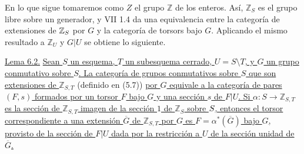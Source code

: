 En lo que sigue tomaremos como $Z$ el grupo $\mathbb Z$ de los
enteros. Así, $\mathbb Z_S$ es el grupo libre sobre un generador, y
VII 1.4 da una equivalencia entre la categoría de extensiones de
$\sisi{\mathbb Z_Z}{\mathbb Z_S}$ por $G$ y la categoría de torsors
bajo $G$. Aplicando el mismo resultado a $\mathbb Z_U$ y $G|U$ se
obtiene lo siguiente.

\medskip
\noindent\underline{Lema 6.2.} \underline{Sean $S$ un esquema, $T$ un
subesquema cerrado, $U=S\setminus T$, y $G$ un grupo conmutativo sobre
$S$. La categoría de grupos conmutativos sobre $S$ que son extensiones
de $\mathbb Z_{S,T}$} (definido en (5.7)) \underline{por $G$ equivale
a la categoría de pares $(F,s)$ formados por un torsor $F$ bajo $G$ y
una sección $s$ de $F|U$. Si $\alpha:S\to\mathbb Z_{S,T}$ es la
sección de $\mathbb Z_{S,T}$ imagen de la sección $1$ de $\mathbb Z_S$
sobre $\sisi{{}_{\overline G}S}{S}$, entonces el torsor correspondiente
a una extensión $\overline G$ de $\mathbb Z_{S,T}$ por $G$ es
$F=\alpha^*(\overline G)$ bajo $G$, provisto de la sección de $F|U$
dada por la restricción a $U$ de la sección unidad de $\overline G$.}

